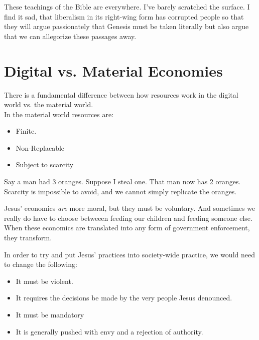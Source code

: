 \documentclass{beamer}
\begin{document}
\begin{frame}
  These teachings of the Bible are everywhere.
  I've barely scratched the surface.
  I find it sad, that liberalism in its right-wing form has corrupted people so that they will argue passionately that Genesis must be taken literally but also argue that we can allegorize these passages away.
\end{frame}

\section{Digital vs. Material Economies}

\begin{frame}
  There is a fundamental difference between how resources work in the digital world vs. the material world.\\
  In the material world resources are:
  \begin{itemize}
	\item Finite.\pause
	\item Non-Replacable\pause
	\item Subject to scarcity
  \end{itemize}
\end{frame}

\begin{frame}
  Say a man had 3 oranges.
  Suppose I steal one.
  That man now has 2 oranges.
  Scarcity is impossible to avoid, and we cannot simply replicate the oranges.
\end{frame}

\begin{frame}
  Jesus' economics \emph{are} more moral, but they must be voluntary.
  And sometimes we really do have to choose betweeen feeding our children and feeding someone else.
  When these economics are translated into any form of government enforcement, they transform.
\end{frame}

\begin{frame}
  In order to try and put Jesus' practices into society-wide practice, we would need to change the following:\pause
  \begin{itemize}
	\item It must be violent.\pause
	\item It requires the decisions be made by the very people Jesus denounced.\pause
	\item It must be mandatory\pause
	\item It is generally pushed with envy and a rejection of authority.
  \end{itemize}
\end{frame}
\end{document}
